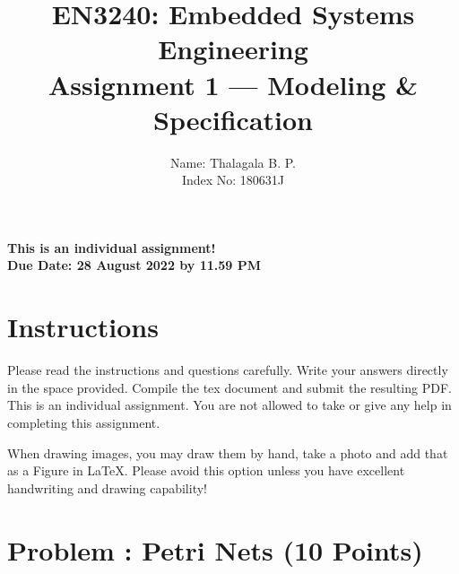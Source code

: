 \documentclass[11pt,letterpaper]{article}
\begin{document}
\title{EN3240: Embedded Systems Engineering \\Assignment 1 --- Modeling \& Specification}

\author{Name: Thalagala B. P. \\ Index No: 180631J}

\maketitle

\begin{center}
	\color{red}\bf This is an individual assignment! \\ Due Date: 28 August 2022 by 11.59 PM
\end{center}

\section*{Instructions}
%

Please read the instructions and questions carefully. Write your answers directly in the space provided. Compile the tex document and submit the resulting PDF. This is an individual assignment. You are not allowed to take or give any help in completing this assignment.

When drawing images, you may draw them by hand, take a photo and add that as a Figure in LaTeX. Please avoid this option unless you have excellent handwriting and drawing capability!


\newpage
\section*{Problem : Petri Nets (10 Points)}
\end{document}
